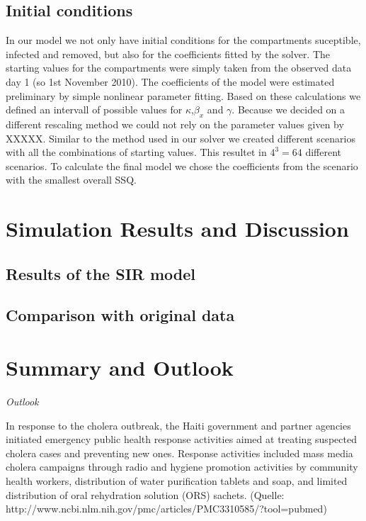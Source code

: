 \documentclass[11pt]{article}
\begin{document}
\subsection{Initial conditions}
\label{sec:initial conditions}
In our model we not only have initial conditions for the compartments suceptible, infected and removed, but also for the coefficients fitted by the solver. The starting values for the compartments were simply taken from the observed data day 1 (so 1st November 2010). The coefficients of the model were estimated preliminary by simple nonlinear parameter fitting. Based on these calculations we defined an intervall of possible values for $\kappa$,$\beta_{x}$ and $\gamma$. Because we decided on a different rescaling method we could not rely on the parameter values given by XXXXX. Similar to the method used in our solver we created different scenarios with all the combinations of starting values. This resultet in $4^{3}=64$ different scenarios. To calculate the final model we chose the coefficients from the scenario with the smallest overall SSQ.


\section{Simulation Results and Discussion}

\subsection{Results of the SIR model}

\subsection{Comparison with original data}


\section{Summary and Outlook}



\noindent\textit{Outlook}

In response to the cholera outbreak, the Haiti government and partner agencies initiated emergency public health response activities aimed at treating suspected cholera cases and preventing new ones. Response activities included mass media cholera campaigns through radio and hygiene promotion activities by community health workers, distribution of water purification tablets and soap, and limited distribution of oral rehydration solution (ORS) sachets. (Quelle: http://www.ncbi.nlm.nih.gov/pmc/articles/PMC3310585/?tool=pubmed)
\end{document}
